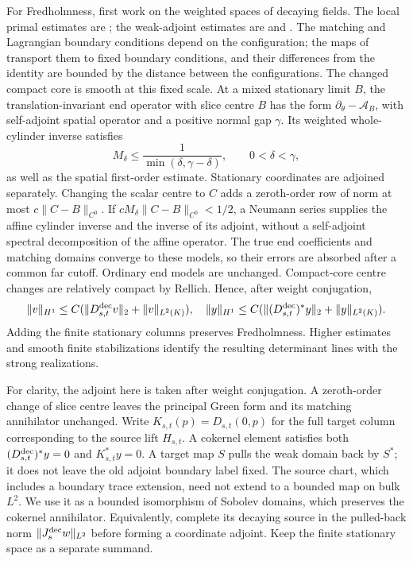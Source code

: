 \documentclass[11pt]{amsart}
\theoremstyle{definition}
\theoremstyle{remark}
\theoremstyle{plain}
\numberwithin{equation}{section}
\begin{document}
For Fredholmness, first work on the weighted spaces of decaying fields. The
local primal estimates are \cite[Theorem~4.17 and Remark~4.19]{DFL};
the weak-adjoint estimates are \cite[Remark~4.33]{DFL} and
\cite[Theorem~5]{DFL-mixed}. The matching and Lagrangian boundary conditions depend on the
configuration; the maps of \cite[Proposition~5.27 and Lemma~5.67]{DFL-mixed}
transport them to fixed boundary conditions, and their differences from
the identity are bounded by the distance between the configurations.
The changed compact core is smooth at this fixed scale. At a
mixed stationary limit $B$, the translation-invariant end operator with
slice centre $B$ has the form
$\partial_\theta-\mathcal A_B$, with self-adjoint spatial
operator and a positive normal gap $\gamma$. Its weighted
whole-cylinder inverse satisfies
\[
 M_\delta\leq\frac1{\min(\delta,\gamma-\delta)},
 \qquad 0<\delta<\gamma,
\]
as well as the spatial first-order estimate. Stationary
coordinates are adjoined separately. Changing the scalar
centre to $C$ adds a zeroth-order row of norm at most
$c\|C-B\|_{C^0}$. If $cM_\delta\|C-B\|_{C^0}<1/2$, a Neumann
series supplies the affine cylinder inverse and the inverse
of its adjoint, without a self-adjoint spectral decomposition of the
affine operator. The true end coefficients
and matching domains converge to these models, so their errors
are absorbed after a common far cutoff. Ordinary end models
are unchanged. Compact-core centre changes are relatively
compact by Rellich. Hence, after weight conjugation,
\[
 \|v\|_{H^1}\leq C(\|D^{\rm dec}_{s,t}v\|_2+\|v\|_{L^2(K)}),
 \quad
 \|y\|_{H^1}\leq C(\|(D^{\rm dec}_{s,t})^* y\|_2
                                      +\|y\|_{L^2(K)}).
\]
Adding the finite stationary columns preserves Fredholmness.
Higher estimates and smooth finite stabilizations identify the
resulting determinant lines with the strong realizations.

For clarity, the adjoint here is taken after weight conjugation.
A zeroth-order change of slice centre leaves the principal Green
form and its matching annihilator unchanged. Write $K_{s,t}(p)=D_{s,t}(0,p)$ for the full target column
corresponding to the source lift $H_{s,t}$. A cokernel element
satisfies both $(D^{\rm dec}_{s,t})^*y=0$ and
$K_{s,t}^*y=0$. A target map $S$
pulls the weak domain back by $S^*$; it does not leave the old
adjoint boundary label fixed. The source chart, which includes
a boundary trace extension, need not extend to a bounded map
on bulk $L^2$. We use it as a bounded isomorphism of Sobolev
domains, which preserves the cokernel annihilator. Equivalently,
complete its decaying source in the pulled-back norm
$\|J_s^{\rm dec}w\|_{L^2}$ before forming a coordinate adjoint.
Keep the finite stationary space as a separate summand.
\end{document}
